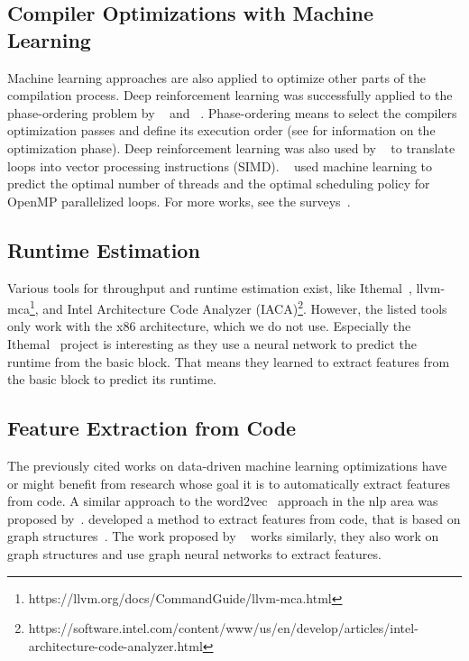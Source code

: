 \subsection{Compiler Optimizations with Machine Learning}
Machine learning approaches are also applied to optimize other parts of the compilation process.
Deep reinforcement learning was successfully applied to the phase-ordering problem by \citeauthor{mammadli2020static}~\cite{mammadli2020static} and \citeauthor{huang2019autophase}~\cite{huang2019autophase}.
Phase-ordering means to select the compilers optimization passes and define its execution order (see  for information on the optimization phase).
Deep reinforcement learning was also used by \citeauthor{haj2020neurovectorizer}~\cite{haj2020neurovectorizer} to translate loops into vector processing instructions (SIMD).
\citeauthor{wang2009mapping}~\cite{wang2009mapping} used machine learning to predict the optimal number of threads and the optimal scheduling policy for OpenMP parallelized loops.
For more works, see the surveys~\cite{wang2018machine,ashouri2018survey}.

\subsection{Runtime Estimation}
Various tools for throughput and runtime estimation exist, like Ithemal~\cite{mendis2019ithemal}, llvm-mca\footnote{https://llvm.org/docs/CommandGuide/llvm-mca.html}, and Intel Architecture Code Analyzer (IACA)\footnote{https://software.intel.com/content/www/us/en/develop/articles/intel-architecture-code-analyzer.html}.
However, the listed tools only work with the x86 architecture, which we do not use.
Especially the Ithemal~\cite{mendis2019ithemal} project is interesting as they use a neural network to predict the runtime from the basic block.
That means they learned to extract features from the basic block to predict its runtime.

\subsection{Feature Extraction from Code}
The previously cited works on data-driven machine learning optimizations have or might benefit from research whose goal it is to automatically extract features from code.
A similar approach to the word2vec~\cite{mikolov2013efficient} approach in the \ac{nlp} area was proposed by~\cite{ben2018neural,alon2019code2vec}.
\citeauthor{cummins2021programl} developed a method to extract features from code, that is based on graph structures~\cite{cummins2021programl}.
The work proposed by \citeauthor{brauckmann2020compiler}~\cite{brauckmann2020compiler} works similarly, they also work on graph structures and use graph neural networks to extract features.

